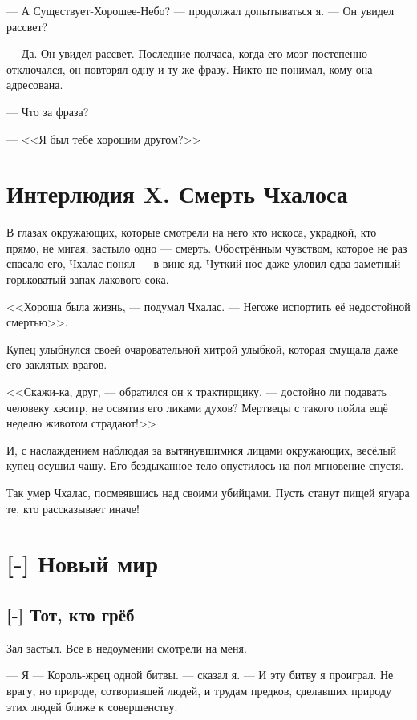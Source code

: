 --- А Существует-Хорошее-Небо? --- продолжал допытываться я.
--- Он увидел рассвет?

--- Да.
Он увидел рассвет.
Последние полчаса, когда его мозг постепенно отключался, он повторял одну и ту же фразу.
Никто не понимал, кому она адресована.

--- Что за фраза?

--- <<Я был тебе хорошим другом?>>

\chapter*{Интерлюдия X. Смерть Чхалоса}

\textspace

В глазах окружающих, которые смотрели на него кто искоса, украдкой, кто прямо, не мигая, застыло одно --- смерть.
Обострённым чувством, которое не раз спасало его, Чхалас понял --- в вине яд.
Чуткий нос даже уловил едва заметный горьковатый запах лакового сока.

<<Хороша была жизнь, --- подумал Чхалас.
--- Негоже испортить её недостойной смертью>>.

Купец улыбнулся своей очаровательной хитрой улыбкой, которая смущала даже его заклятых врагов.

<<Скажи-ка, друг, --- обратился он к трактирщику, --- достойно ли подавать человеку хэситр, не освятив его ликами духов?
Мертвецы с такого пойла ещё неделю животом страдают!>>

И, с наслаждением наблюдая за вытянувшимися лицами окружающих, весёлый купец осушил чашу.
Его бездыханное тело опустилось на пол мгновение спустя.

Так умер Чхалас, посмеявшись над своими убийцами.
Пусть станут пищей ягуара те, кто рассказывает иначе!

\chapter{[-] Новый мир}

\section{[-] Тот, кто грёб}

\textspace

Зал застыл.
Все в недоумении смотрели на меня.

--- Я --- Король-жрец одной битвы. --- сказал я.
--- И эту битву я проиграл.
Не врагу, но природе, сотворившей людей, и трудам предков, сделавших природу этих людей ближе к совершенству.

